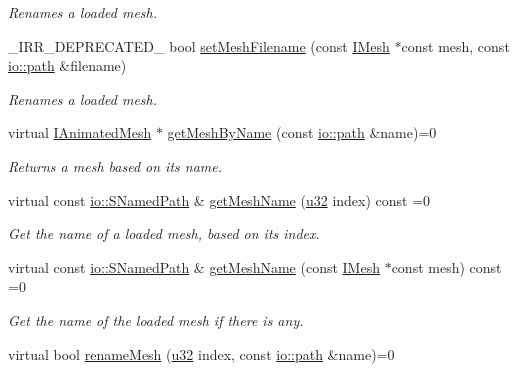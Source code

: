 \begin{DoxyCompactItemize}
\begin{DoxyCompactList}\small\item\em Renames a loaded mesh. \end{DoxyCompactList}\item 
\+\_\+\+I\+R\+R\+\_\+\+D\+E\+P\+R\+E\+C\+A\+T\+E\+D\+\_\+ bool \hyperlink{classirr_1_1scene_1_1IMeshCache_a9b7770a23859ddd045b3c22dfbecbcaf}{set\+Mesh\+Filename} (const \hyperlink{classirr_1_1scene_1_1IMesh}{I\+Mesh} $\ast$const mesh, const \hyperlink{namespaceirr_1_1io_a6468281622ce3a1c46b72e19f32dded5}{io\+::path} \&filename)
\begin{DoxyCompactList}\small\item\em Renames a loaded mesh. \end{DoxyCompactList}\item 
virtual \hyperlink{classirr_1_1scene_1_1IAnimatedMesh}{I\+Animated\+Mesh} $\ast$ \hyperlink{classirr_1_1scene_1_1IMeshCache_a4c93e736bdca8c84d478afc82540d6bb}{get\+Mesh\+By\+Name} (const \hyperlink{namespaceirr_1_1io_a6468281622ce3a1c46b72e19f32dded5}{io\+::path} \&name)=0
\begin{DoxyCompactList}\small\item\em Returns a mesh based on its name. \end{DoxyCompactList}\item 
virtual const \hyperlink{structirr_1_1io_1_1SNamedPath}{io\+::\+S\+Named\+Path} \& \hyperlink{classirr_1_1scene_1_1IMeshCache_af06efb8fb21f6bba16e52d879b5d3ddd}{get\+Mesh\+Name} (\hyperlink{namespaceirr_a0416a53257075833e7002efd0a18e804}{u32} index) const =0
\begin{DoxyCompactList}\small\item\em Get the name of a loaded mesh, based on its index. \end{DoxyCompactList}\item 
virtual const \hyperlink{structirr_1_1io_1_1SNamedPath}{io\+::\+S\+Named\+Path} \& \hyperlink{classirr_1_1scene_1_1IMeshCache_a7271fa1247b8c1198c196dc947b5ede0}{get\+Mesh\+Name} (const \hyperlink{classirr_1_1scene_1_1IMesh}{I\+Mesh} $\ast$const mesh) const =0
\begin{DoxyCompactList}\small\item\em Get the name of the loaded mesh if there is any. \end{DoxyCompactList}\item 
virtual bool \hyperlink{classirr_1_1scene_1_1IMeshCache_a820743b703cdc4362a3dbe6664271bcb}{rename\+Mesh} (\hyperlink{namespaceirr_a0416a53257075833e7002efd0a18e804}{u32} index, const \hyperlink{namespaceirr_1_1io_a6468281622ce3a1c46b72e19f32dded5}{io\+::path} \&name)=0

\end{DoxyCompactItemize}
